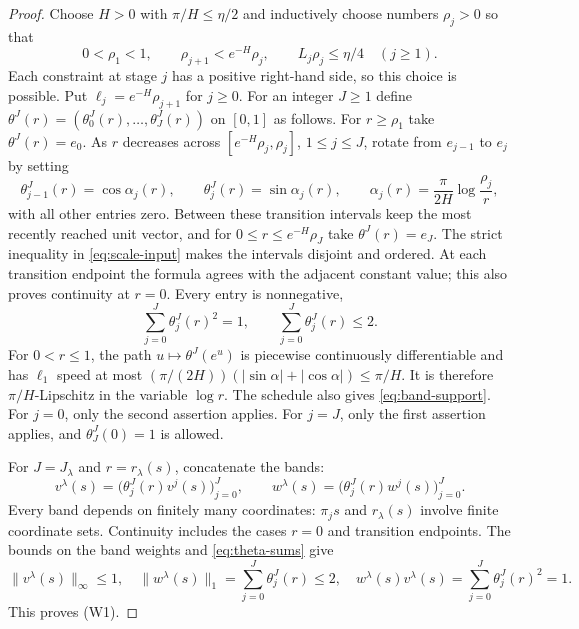 \begin{proof}
Choose $H>0$ with $\pi/H\leq\eta/2$ and inductively choose numbers
$\rho_j>0$ so that
\begin{equation}
 0<\rho_1<1,\qquad
 \rho_{j+1}<e^{-H}\rho_j,\qquad
 L_j\rho_j\leq\eta/4\quad(j\geq1).                 \label{eq:scale-input}
\end{equation}
Each constraint at stage $j$ has a positive right-hand side, so this
choice is possible.  Put $\ell_j=e^{-H}\rho_{j+1}$ for $j\geq0$.
For an integer $J\geq1$ define
$\theta^J(r)=(\theta^J_0(r),\ldots,\theta^J_J(r))$ on $[0,1]$ as
follows.  For $r\geq\rho_1$ take $\theta^J(r)=e_0$.  As $r$
decreases across $[e^{-H}\rho_j,\rho_j]$, $1\leq j\leq J$,
rotate from $e_{j-1}$ to $e_j$ by setting
\[
 \theta^J_{j-1}(r)=\cos\alpha_j(r),\qquad
 \theta^J_j(r)=\sin\alpha_j(r),\qquad
 \alpha_j(r)=\frac{\pi}{2H}\log\frac{\rho_j}{r},
\]
with all other entries zero.  Between these transition intervals keep
the most recently reached unit vector, and for
$0\leq r\leq e^{-H}\rho_J$ take $\theta^J(r)=e_J$.  The strict
inequality in \eqref{eq:scale-input} makes the intervals disjoint and ordered.
At each transition endpoint the formula agrees with the adjacent
constant value; this also proves continuity at $r=0$.  Every entry is
nonnegative,
\begin{equation}
 \sum_{j=0}^J\theta^J_j(r)^2=1,\qquad
 \sum_{j=0}^J\theta^J_j(r)\leq2.                    \label{eq:theta-sums}
\end{equation}
For $0<r\leq1$, the path $u\mapsto\theta^J(e^u)$ is
piecewise continuously differentiable and has $\ell_1$ speed at most
$(\pi/(2H))(|\sin\alpha|+|\cos\alpha|)\leq\pi/H$.
It is therefore $\pi/H$-Lipschitz in the variable $\log r$.
The schedule also gives \eqref{eq:band-support}.  For $j=0$, only
the second assertion applies.  For $j=J$, only the first assertion
applies, and $\theta_J^J(0)=1$ is allowed.

For $J=J_\lambda$ and $r=r_\lambda(s)$, concatenate the bands:
\[
 v^\lambda(s)
   =\bigl(\theta_j^J(r)v^j(s)\bigr)_{j=0}^J,
 \qquad
 w^\lambda(s)
   =\bigl(\theta_j^J(r)w^j(s)\bigr)_{j=0}^J.
\]
Every band depends on finitely many coordinates: $\pi_j s$ and
$r_\lambda(s)$ involve finite coordinate sets.  Continuity includes
the cases $r=0$ and transition endpoints.  The bounds on the band
weights and \eqref{eq:theta-sums} give
\[
 \|v^\lambda(s)\|_\infty\leq1,\quad
 \|w^\lambda(s)\|_1=\sum_{j=0}^J\theta_j^J(r)\leq2,\quad
 w^\lambda(s)v^\lambda(s)
       =\sum_{j=0}^J\theta_j^J(r)^2=1.
\]
This proves (W1).


\end{proof}
